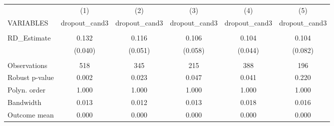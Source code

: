 \documentclass[]{article}
\begin{document}
\begin{tabular}{lccccc} \hline
 & (1) & (2) & (3) & (4) & (5) \\
VARIABLES & dropout\_cand3 & dropout\_cand3 & dropout\_cand3 & dropout\_cand3 & dropout\_cand3 \\ \hline
 &  &  &  &  &  \\
RD\_Estimate & 0.132 & 0.116 & 0.106 & 0.104 & 0.104 \\
 & (0.040) & (0.051) & (0.058) & (0.044) & (0.082) \\
 &  &  &  &  &  \\
Observations & 518 & 345 & 215 & 388 & 196 \\
Robust p-value & 0.002 & 0.023 & 0.047 & 0.041 & 0.220 \\
Polyn. order & 1.000 & 1.000 & 1.000 & 1.000 & 1.000 \\
Bandwidth & 0.013 & 0.012 & 0.013 & 0.018 & 0.016 \\
 Outcome mean & 0.000 & 0.000 & 0.000 & 0.000 & 0.000 \\ \hline
\end{tabular}
\end{document}
